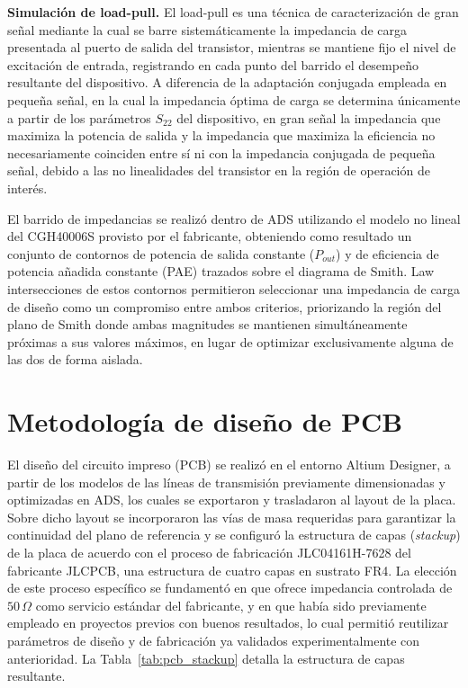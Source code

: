 \textbf{Simulación de load-pull.} El load-pull es una técnica de caracterización de gran señal mediante la cual se barre sistemáticamente la impedancia de carga presentada al puerto de salida del transistor, mientras se mantiene fijo el nivel de excitación de entrada, registrando en cada punto del barrido el desempeño resultante del dispositivo. A diferencia de la adaptación conjugada empleada en pequeña señal, en la cual la impedancia óptima de carga se determina únicamente a partir de los parámetros $S_{22}$ del dispositivo, en gran señal la impedancia que maximiza la potencia de salida y la impedancia que maximiza la eficiencia no necesariamente coinciden entre sí ni con la impedancia conjugada de pequeña señal, debido a las no linealidades del transistor en la región de operación de interés.

El barrido de impedancias se realizó dentro de ADS utilizando el modelo no lineal del CGH40006S provisto por el fabricante, obteniendo como resultado un conjunto de contornos de potencia de salida constante ($P_{out}$) y de eficiencia de potencia añadida constante (PAE) trazados sobre el diagrama de Smith. Law intersecciones de estos contornos permitieron seleccionar una impedancia de carga de diseño como un compromiso entre ambos criterios, priorizando la región del plano de Smith donde ambas magnitudes se mantienen simultáneamente próximas a sus valores máximos, en lugar de optimizar exclusivamente alguna de las dos de forma aislada.

\section{Metodología de diseño de PCB}
El diseño del circuito impreso (PCB) se realizó en el entorno Altium Designer, a partir de los modelos de las líneas de transmisión previamente dimensionadas y optimizadas en ADS, los cuales se exportaron y trasladaron al layout de la placa. Sobre dicho layout se incorporaron las vías de masa requeridas para garantizar la continuidad del plano de referencia y se configuró la estructura de capas (\textit{stackup}) de la placa de acuerdo con el proceso de fabricación JLC04161H-7628 del fabricante JLCPCB, una estructura de cuatro capas en sustrato FR4. La elección de este proceso específico se fundamentó en que ofrece impedancia controlada de $50\,\Omega$ como servicio estándar del fabricante, y en que había sido previamente empleado en proyectos previos con buenos resultados, lo cual permitió reutilizar parámetros de diseño y de fabricación ya validados experimentalmente con anterioridad. La Tabla~\ref{tab:pcb_stackup} detalla la estructura de capas resultante.

